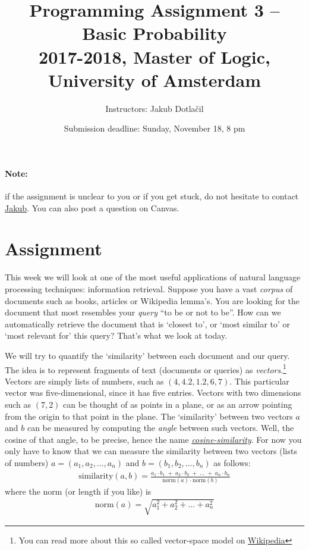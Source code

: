 \documentclass[11pt, a4paper]{article}
\title{Programming Assignment 3 -- Basic Probability \\[2mm]
\large{2017-2018, Master of Logic, University of Amsterdam}}
\author{Instructors: Jakub Dotla\v{c}il}
\date{Submission deadline: Sunday, November 18, 8 pm}
\begin{document}
\maketitle

\paragraph{Note:} if the assignment is unclear to you or if you get stuck, do not hesitate to contact \href{mailto:j.dotlacil@uva.nl}{Jakub}. You can also post a question on Canvas.

\section{Assignment}
This week we will look at one of the most useful applications of natural language processing techniques: information retrieval. 
Suppose you have a vast \emph{corpus} of documents such as books, articles or Wikipedia lemma's.
You are looking for the document that most resembles your \emph{query} ``to be or not to be''. 
How can we automatically retrieve the document that is `closest to', or `most similar to' or `most relevant for' this query?
That's what we look at today.



We will try to quantify the `similarity' between each document and our query. 
The idea is to represent fragments of text (documents or queries) as \emph{vectors}.\footnote{You can read more about this so called vector-space model on \href{https://en.wikipedia.org/wiki/Vector_space_model}{Wikipedia}} 
Vectors are simply lists of numbers, such as $(4, 4.2, 1.2, 6, 7)$. 
This particular vector was five-dimensional, since it has five entries. 
Vectors with two dimensions such as $(7, 2)$ can be thought of as points in a plane, or as an arrow pointing from the origin to that point in the plane.
The `similarity' between two vectors $a$ and $b$ can be measured by computing the \emph{angle} between such vectors. 
Well, the cosine of that angle, to be precise, hence the name \emph{\href{https://en.wikipedia.org/wiki/Cosine_similarity}{cosine-similarity}}. 
For now you only have to know that we can measure the similarity between two vectors (lists of numbers) $a=(a_1, a_2, \dots, a_n)$ and $b = (b_1, b_2, \dots, b_n)$ as follows:
\begin{align}
  \text{similarity}(a, b) 
    = \frac{ a_1 \cdot b_1 \;+\; a_2 \cdot b_2 \;+\; \dots \;+\; a_n \cdot b_n}%
      {\text{norm}(a) \cdot \text{norm}(b)}
\end{align}
where the norm (or length if you like) is
\begin{align}
  \text{norm}(a) = \sqrt{a_1^2 + a_2^2 + \dots + a_n^2}
\end{align}
\end{document}
